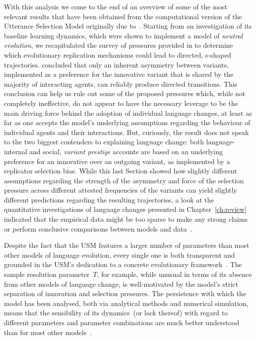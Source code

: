 With this analysis we come to the end of an overview of some of the most relevant results that have been obtained from the computational version of the Utterance Selection Model originally due to~\citet{Baxter2006}.
Starting from an investigation of its baseline learning dynamics, which were shown to implement a model of \emph{neutral evolution}, we recapitulated the survey of pressures provided in \citet{Blythe2012} to determine which evolutionary replication mechanisms could lead to directed, s-shaped trajectories. \citeauthor{Blythe2012} concluded that only an inherent asymmetry between variants, implemented as a preference for the innovative variant that is shared by the majority of interacting agents, can reliably produce directed transitions. This conclusion can help us rule out some of the proposed pressures which, while not completely ineffective, do not appear to have the necessary leverage to be the main driving force behind the adoption of individual language changes, at least as far as one accepts the model's underlying assumptions regarding the behaviour of individual agents and their interactions.
But, curiously, the result does not speak to the two biggest contenders to explaining language change: both language-internal and social, \emph{variant prestige} accounts are based on an underlying preference for an innovative over an outgoing variant, as implemented by a replicator selection bias. While this last Section showed how slightly different assumptions regarding the strength of the asymmetry and force of the selection pressure across different attested frequencies of the variants can yield slightly different predictions regarding the resulting trajectories, a look at the quantitative investigations of language changes presented in Chapter~\ref{ch:review} indicated that the empirical data might be too sparse to make any strong claims or perform conclusive comparisons between models and data~\citep[although see][]{Altmann2013,Ghanbarnejad2014}.

Despite the fact that the USM features a larger number of parameters than most other models of language evolution, every single one is both transparent and grounded in the USM's dedication to a concrete evolutionary framework~\citep{Croft2000}.
The sample resolution parameter~$T$, for example, while unusual in terms of its absence from other models of language change, is well-motivated by the model's strict separation of innovation and selection pressures.
The persistence with which the model has been analysed, both via analytical methods and numerical simulation, means that the sensibility of its dynamics~(or lack thereof) with regard to different parameters and parameter combinations are much better understood than for most other models~\citep{Blythe2007divided,Baxter2009,Blythe2009,Blythe2012neutral,Baxter2016,Michaud2017}.

